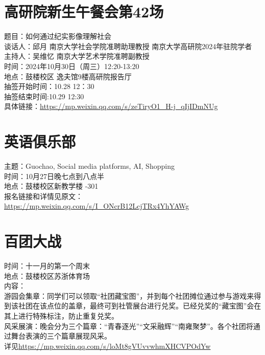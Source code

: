 \documentclass[letterpaper, 12pt]{article}
\begin{document}
\begin{multicols}{2}
\section{高研院新生午餐会第42场}
题目：如何通过纪实影像理解社会\\
谈话人：邱月 南京大学社会学院准聘助理教授 南京大学高研院2024年驻院学者\\
主持人：吴维忆 南京大学艺术学院准聘副教授\\
时间：2024年10月30日（周三）12:20-13:20\\
地点：鼓楼校区 逸夫馆9楼高研院报告厅\\
抽签开始时间：10.28 12：30\\
抽签结束时间:10.29 12:30\\
具体链接：\url{https://mp.weixin.qq.com/s/zeTiryO1_H-j_qIjIDmNUg}\\

\section{英语俱乐部}
主题：Guochao, Social media platforms, AI, Shopping\\
时间：10月27日晚七点到八点半\\
地点：鼓楼校区新教学楼 -301\\
报名链接和详情见原文：\url{https://mp.weixin.qq.com/s/I_ONcrB12LcjTRx4YhYAWg}
\section{百团大战}
时间：十一月的第一个周末\\
地点：鼓楼校区苏浙体育场\\
内容：\\
游园会集章：同学们可以领取“社团藏宝图”，并到每个社团摊位通过参与游戏来得到该社团在该点位的盖章，最终可到社管展台进行兑奖。已经兑奖的“藏宝图”会在其上进行特殊标注，防止重复兑奖。\\
风采展演：晚会分为三个篇章：“青春逐光”“文采融辉”“南雍聚梦”。各个社团将通过舞台表演的三个篇章展现风采。\\
详见\url{https://mp.weixin.qq.com/s/loMt8gVUvvwhmXHCVPOdYw}

\end{multicols}
\end{document}
